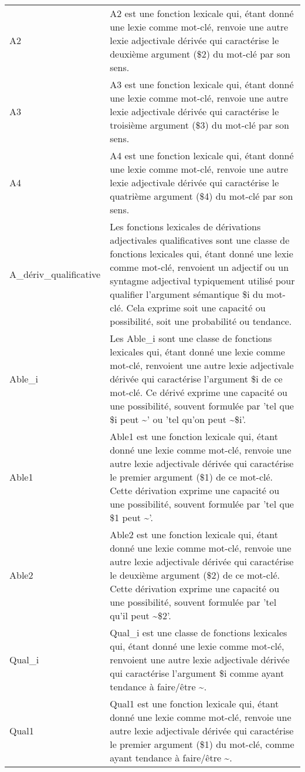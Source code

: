 \begin{longtable}{ll}
A2 & A2 est une fonction lexicale qui, étant donné une lexie comme mot-clé, renvoie une autre lexie adjectivale dérivée qui caractérise le deuxième argument (\$2) du mot-clé par son sens. \\
A3 & A3 est une fonction lexicale qui, étant donné une lexie comme mot-clé, renvoie une autre lexie adjectivale dérivée qui caractérise le troisième argument (\$3) du mot-clé par son sens. \\
A4 & A4 est une fonction lexicale qui, étant donné une lexie comme mot-clé, renvoie une autre lexie adjectivale dérivée qui caractérise le quatrième argument (\$4) du mot-clé par son sens. \\
A\_dériv\_qualificative & Les fonctions lexicales de dérivations adjectivales qualificatives sont une classe de fonctions lexicales qui, étant donné une lexie comme mot-clé, renvoient un adjectif ou un syntagme adjectival typiquement utilisé pour qualifier l'argument sémantique \$i du mot-clé. Cela exprime soit une capacité ou possibilité, soit une probabilité ou tendance. \\
Able\_i & Les Able\_i sont une classe de fonctions lexicales qui, étant donné une lexie comme mot-clé, renvoient une autre lexie adjectivale dérivée qui caractérise l'argument \$i de ce mot-clé. Ce dérivé exprime une capacité ou une possibilité, souvent formulée par 'tel que \$i peut \textasciitilde ' ou 'tel qu'on peut \textasciitilde \space \$i'. \\
Able1 & Able1 est une fonction lexicale qui, étant donné une lexie comme mot-clé, renvoie une autre lexie adjectivale dérivée qui caractérise le premier argument (\$1) de ce mot-clé. Cette dérivation exprime une capacité ou une possibilité, souvent formulée par 'tel que \$1 peut \textasciitilde '. \\
Able2 & Able2 est une fonction lexicale qui, étant donné une lexie comme mot-clé, renvoie une autre lexie adjectivale dérivée qui caractérise le deuxième argument (\$2) de ce mot-clé. Cette dérivation exprime une capacité ou une possibilité, souvent formulée par 'tel qu'il peut \textasciitilde \space \$2'. \\
Qual\_i & Qual\_i est une classe de fonctions lexicales qui, étant donné une lexie comme mot-clé, renvoient une autre lexie adjectivale dérivée qui caractérise l'argument \$i comme ayant tendance à faire/être \textasciitilde . \\
Qual1 & Qual1 est une fonction lexicale qui, étant donné une lexie comme mot-clé, renvoie une autre lexie adjectivale dérivée qui caractérise le premier argument (\$1) du mot-clé, comme ayant tendance à faire/être \textasciitilde . \\

\end{longtable}
